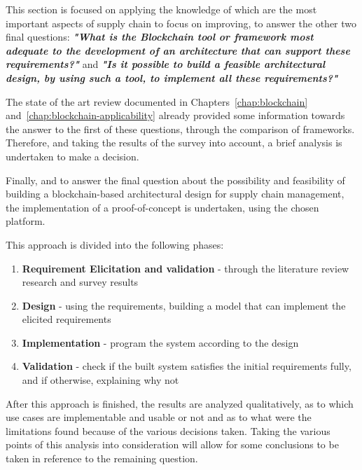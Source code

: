 This section is focused on applying the knowledge of which are the most important aspects of supply chain to focus on improving, to answer the other two final questions: \textbf{\textit{"What is the Blockchain tool or framework most adequate to the development of an architecture that can support these requirements?"}} and 
\textbf{\textit{"Is it possible to build a feasible architectural design, by using such a tool, to implement all these requirements?"}}


The state of the art review documented in Chapters~\ref{chap:blockchain} and~\ref{chap:blockchain-applicability} already provided some information towards the answer to the first of these questions, through the comparison of frameworks. Therefore, and taking the results of the survey into account, a brief analysis is undertaken to make a decision.

Finally, and to answer the final question about the possibility and feasibility of building a blockchain-based architectural design for supply chain management, the implementation of a proof-of-concept is undertaken, using the chosen platform. 

This approach is divided into the following phases:
\begin{enumerate}
\item \textbf{Requirement Elicitation and validation} - through the literature review research and survey results 
\item \textbf{Design} - using the requirements, building a model that can implement the elicited requirements
\item \textbf{Implementation} - program the system according to the design
\item \textbf{Validation} - check if the built system satisfies the initial requirements fully, and if otherwise, explaining why not
\end{enumerate}

After this approach is finished, the results are analyzed qualitatively, as to which use cases are implementable and usable or not and as to what were the limitations found because of the various decisions taken. Taking the various points of this analysis into consideration will allow for some conclusions to be taken in reference to the remaining question.


